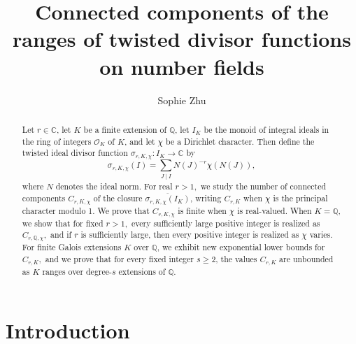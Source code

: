 \documentclass[12pt]{amsart}
\theoremstyle{definition}
\numberwithin{equation}{section}
\newcommand{\Q}{\mathbb{Q}}
\begin{document}
	
	\mbox{}
	\title{Connected components of the ranges of twisted divisor functions on number fields}
	\author{Sophie Zhu}
	\address{Harvard College}
\date{}

\begin{abstract} 
    Let $r\in\mathbb{C}$, let $K$ be a finite extension of $\mathbb{Q}$, let $I_K$ be the monoid of integral ideals in the ring of integers $\mathcal{O}_K$ of $K$, and let $\chi$ be a Dirichlet character. Then define the twisted ideal divisor function $\sigma_{r, K, \chi} : I_K \rightarrow \mathbb{C}$ by $$\sigma_{r,K,\chi}(I) = \sum_{J \mid I} N(J)^{-r}\chi(N(J)),$$ where $N$ denotes the ideal norm. For real $r>1,$ we study the number of connected components $C_{r, K, \chi}$ of the closure $\overline{\sigma_{r,K,\chi}(I_K)}$, writing $C_{r,K}$ when $\chi$ is the principal character modulo 1. We prove that $C_{r,K,\chi}$ is finite when $\chi$ is real-valued. When $K = \mathbb{Q}$, we show that for fixed $r > 1,$ every sufficiently large positive integer is realized as $C_{r,\Q,\chi},$ and if $r$ is sufficiently large, then every positive integer is realized as $\chi$ varies. For finite Galois extensions $K$ over $\mathbb{Q}$, we exhibit new exponential lower bounds for $C_{r,K},$ and we prove that for every fixed integer $s \geq 2$, the values $C_{r,K}$ are unbounded as $K$ ranges over degree-$s$ extensions of $\mathbb{Q}$. 
\end{abstract}


\maketitle


\section{Introduction}
\end{document}

